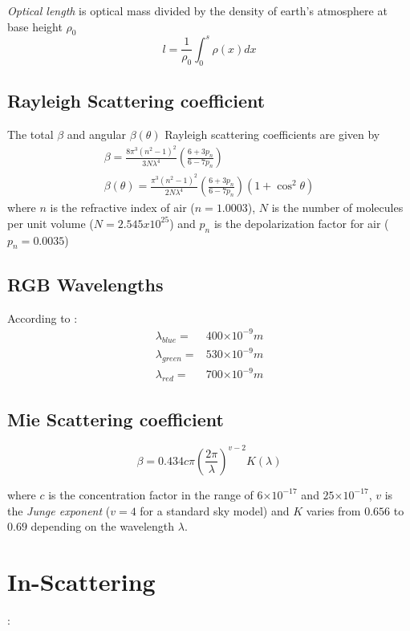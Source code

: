 \documentclass[12pt,a4paper]{scrartcl}
\newcommand{\e}[1]{\ensuremath{\times 10^{#1}}}
\begin{document}
\emph{Optical length} is optical mass divided by the density of earth's atmosphere at base height $\rho_0$
\begin{equation}
l = \frac{1}{\rho_0} \int^s_0 \rho(x)dx
\end{equation}


\subsection{Rayleigh Scattering coefficient}
The total $\beta$ and angular $\beta(\theta)$ Rayleigh scattering coefficients are given by \cite{Preetham03Modeling-skylight}
\begin{gather}
\beta = \frac{8 \pi^3(n^2 - 1)^2}{3N\lambda^4} \left(\frac{6 + 3 p_n}{6 - 7 p_n} \right) \\
\beta(\theta) = \frac{\pi^3(n^2 - 1)^2}{2N\lambda^4} \left(\frac{6 + 3 p_n}{6 - 7 p_n} \right) (1 +  \cos^2 \theta)
\end{gather}
where $n$ is the refractive index of air ($n = 1.0003$), $N$ is the number of molecules per unit volume ($N = 2.545x10^{25}$) and $p_n$ is the depolarization factor for air ($p_n = 0.0035$)

\subsection{RGB Wavelengths}
According to \cite{Preetham03Modeling-skylight}:
\begin{align}
\lambda_{blue} =& 400\e{-9}m \\
\lambda_{green} =& 530\e{-9}m \\
\lambda_{red} =& 700\e{-9}m
\end{align}

\subsection{Mie Scattering coefficient}
\begin{equation}
\beta = 0.434 c \pi \left(\frac{2 \pi}{\lambda}\right)^{v-2}K(\lambda)
\end{equation}

where $c$ is the concentration factor in the range of $6\e{-17}$ and $25\e{-17}$, $v$ is the \emph{Junge exponent} ($v = 4 $ for a standard sky model) and  $K$ varies from $0.656$ to $0.69$ depending on the wavelength $\lambda$.


\section{In-Scattering}
\cite{Preetham03Modeling-skylight}:
\end{document}
